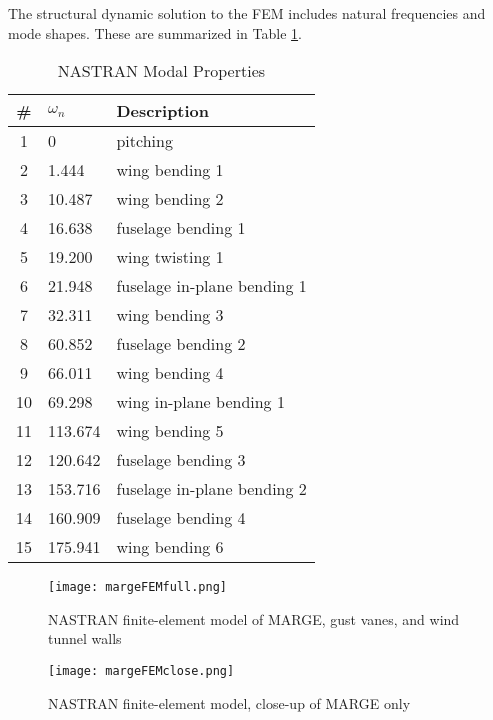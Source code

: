 The structural dynamic solution to the FEM includes natural frequencies and mode shapes. These are summarized in Table \ref{tab:nastranResult}.
\begin{table}[H]
	\centering
	\label{tab:nastranResult}
	\caption{NASTRAN Modal Properties}
	\begin{tabular}{cll}
		\hline\hline
		\# & $\omega_n$ & Description \\
		\hline
		1  &   0     & pitching \\
		2  &   1.444 & wing bending 1 \\
		3  &  10.487 & wing bending 2 \\
		4  &  16.638 & fuselage bending 1 \\
		5  &  19.200 & wing twisting 1 \\
		6  &  21.948 & fuselage in-plane bending 1 \\
		7  &  32.311 & wing bending 3 \\
		8  &  60.852 & fuselage bending 2 \\
		9  &  66.011 & wing bending 4 \\
		10 &  69.298 & wing in-plane bending 1 \\
		11 & 113.674 & wing bending 5 \\
		12 & 120.642 & fuselage bending 3 \\
		13 & 153.716 & fuselage in-plane bending 2  \\
		14 & 160.909 & fuselage bending 4 \\
		15 & 175.941 & wing bending 6 \\
		\hline\hline
	\end{tabular}
\end{table}


\begin{landscape}

\begin{figure}[h]
	\centering
	\label{fig:nastranWindowFull}
	\texttt{[image: margeFEMfull.png]}
	\caption{NASTRAN finite-element model of MARGE, gust vanes, and wind tunnel walls}
\end{figure}
\begin{figure}[h]
	\centering
	\label{fig:nastranWindowClose}
	\texttt{[image: margeFEMclose.png]}
	\caption{NASTRAN finite-element model, close-up of MARGE only}
\end{figure}

\end{landscape}
